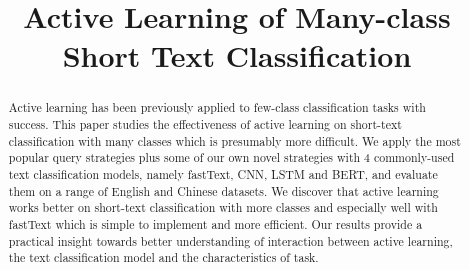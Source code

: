 \documentclass[letterpaper]{article} %
\title{Active Learning of Many-class Short Text Classification}
\theoremstyle{definition}
\newcommand{\EVE}[1]{\textcolor{red}{eve: #1}}
\begin{document}
\maketitle

\begin{abstract}
	Active learning has been previously applied to few-class classification tasks
	with success. This paper studies the effectiveness of active learning on
	short-text classification with many classes which is presumably more difficult.
	We apply the most popular query strategies plus some of our own
	novel strategies with 4 commonly-used text classification models, 
	namely fastText, CNN, LSTM and BERT, and evaluate them on a range of 
	English and Chinese datasets. We discover that active learning 
	works better on short-text classification with more classes and 
	especially well with fastText which is simple to implement and more efficient. 
	Our results provide a practical insight towards 
	better understanding of interaction between active learning, 
	the text classification model and the characteristics of task.   
\end{abstract}



%


% 



%

%
% 
\end{document}
